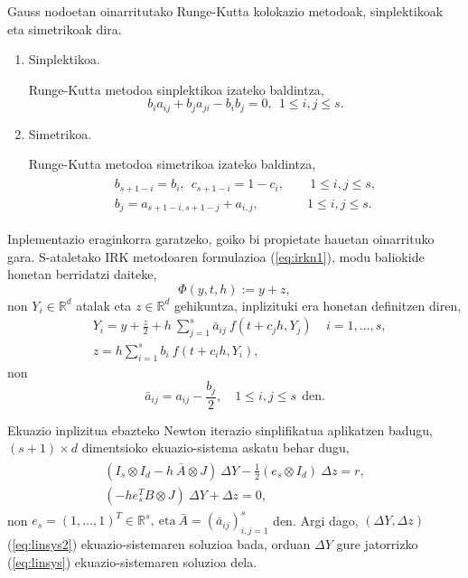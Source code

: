 Gauss nodoetan oinarritutako Runge-Kutta kolokazio metodoak, sinplektikoak eta simetrikoak \cite{Sanz-Serna1992} dira. 
\begin{enumerate}
\item Sinplektikoa.

Runge-Kutta metodoa sinplektikoa izateko baldintza,
\begin{equation} 
\label{eq:sympl}
b_{i}a_{ij}+b_{j}a_{ji}-b_{i}b_{j}=0, \ \ 1 \leqslant i,j \leqslant s.
\end{equation} 
\item Simetrikoa.

Runge-Kutta metodoa simetrikoa izateko baldintza,
\begin{align}
\label{eq:simm}
\begin{split}
b_{s+1-i}=b_i, \ \ {c}_{s+1-i}=1-{c}_i,& \quad \ 1\leqslant i,j \leqslant s, \\
b_j={a}_{s+1-i,s+1-j}+a_{i,j},& \quad 1\leqslant i,j \leqslant s. 
\end{split}
\end{align} 
\end{enumerate}

Inplementazio eraginkorra garatzeko, goiko bi propietate hauetan oinarrituko gara.
S-ataletako IRK metodoaren formulazioa (\ref{eq:irkn1}), modu baliokide honetan berridatzi daiteke,
\begin{equation}
\Phi(y,t,h):=y+z,
\end{equation}
non $Y_i \in \mathbb{R}^d$ atalak eta $z \in \mathbb{R}^d$ gehikuntza, inplizituki era honetan definitzen diren,
\begin{align}
&Y_{i}=y+\frac{z}{2}+ h\ \sum^s_{j=1}{\bar{a}_{ij}\ f(t+c_jh,Y_{j})}\ \ \ \ \ i=1 ,\dots, s,\\
&z=h \sum_{i=1}^{s} {b_i \ f(t+c_ih,Y_{i})},
\end{align} 
non
\begin{equation}
\bar{a}_{ij}=a_{ij}-\frac{b_j}{2}, \quad 1\leqslant i,j \leqslant s \ \ \text{den}.
\end{equation} 

Ekuazio inplizitua ebazteko Newton iterazio sinplifikatua aplikatzen badugu, $(s+1) \times d$ dimentsioko ekuazio-sistema askatu behar dugu,
\begin{align}
\label{eq:linsys2}
\begin{split}
(I_s \otimes I_d- h \ \bar{A} \otimes J) \ \Delta Y - \frac{1}{2}(e_s \otimes I_d) \ \Delta z =r,\\
(-h e_s^T B \otimes J) \ \Delta Y+  \Delta z=0,
\end{split}
\end{align}
non $e_s=(1,\dots,1)^T \in \mathbb{R}^{s}, \ \text{eta} \ \bar{A}=(\bar{a}_{ij})_{i,j=1}^s$ den. Argi dago, $(\Delta Y, \Delta z)$ (\ref{eq:linsys2}) ekuazio-sistemaren soluzioa bada, orduan $\Delta Y$ gure jatorrizko (\ref{eq:linsys}) ekuazio-sistemaren soluzioa dela.

